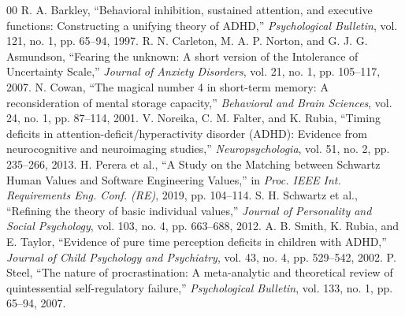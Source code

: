 \documentclass[conference]{IEEEtran}
\begin{document}
\begin{thebibliography}{00}
 R. A. Barkley, ``Behavioral inhibition, sustained attention, and executive functions: Constructing a unifying theory of ADHD,'' \textit{Psychological Bulletin}, vol. 121, no. 1, pp. 65--94, 1997.
 R. N. Carleton, M. A. P. Norton, and G. J. G. Asmundson, ``Fearing the unknown: A short version of the Intolerance of Uncertainty Scale,'' \textit{Journal of Anxiety Disorders}, vol. 21, no. 1, pp. 105--117, 2007.
 N. Cowan, ``The magical number 4 in short-term memory: A reconsideration of mental storage capacity,'' \textit{Behavioral and Brain Sciences}, vol. 24, no. 1, pp. 87--114, 2001.
 V. Noreika, C. M. Falter, and K. Rubia, ``Timing deficits in attention-deficit/hyperactivity disorder (ADHD): Evidence from neurocognitive and neuroimaging studies,'' \textit{Neuropsychologia}, vol. 51, no. 2, pp. 235--266, 2013.
 H. Perera et al., ``A Study on the Matching between Schwartz Human Values and Software Engineering Values,'' in \textit{Proc. IEEE Int. Requirements Eng. Conf. (RE)}, 2019, pp. 104--114.
 S. H. Schwartz et al., ``Refining the theory of basic individual values,'' \textit{Journal of Personality and Social Psychology}, vol. 103, no. 4, pp. 663--688, 2012.
 A. B. Smith, K. Rubia, and E. Taylor, ``Evidence of pure time perception deficits in children with ADHD,'' \textit{Journal of Child Psychology and Psychiatry}, vol. 43, no. 4, pp. 529--542, 2002.
 P. Steel, ``The nature of procrastination: A meta-analytic and theoretical review of quintessential self-regulatory failure,'' \textit{Psychological Bulletin}, vol. 133, no. 1, pp. 65--94, 2007.
\end{thebibliography}
\end{document}
